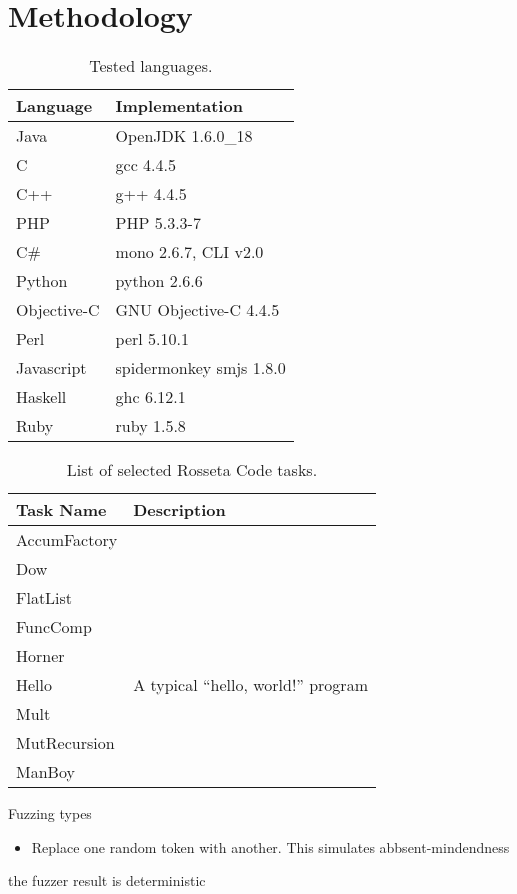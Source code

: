 \documentclass[10pt]{sigplanconf}
\begin{document}
\section{Methodology} %
\begin{table}
\begin{center}
\caption{Tested languages.}
\label{tab:langs}
\begin{tabular}{ l l}
 \hline
Language & Implementation \\
\hline
Java 		& OpenJDK 1.6.0\_18 \\
C 		& gcc 4.4.5 \\
C++ 		& g++ 4.4.5 \\
PHP 		& PHP 5.3.3-7 \\
C\# 		& mono 2.6.7, CLI v2.0 \\
Python 		& python 2.6.6 \\
Objective-C 	& GNU Objective-C 4.4.5 \\
Perl 		& perl 5.10.1 \\
Javascript 	& spidermonkey smjs 1.8.0 \\
Haskell 	& ghc 6.12.1 \\
Ruby 		& ruby 1.5.8 \\
\hline
\end{tabular}
\end{center}
\end{table}

\begin{table}
\begin{center}
\caption{List of selected Rosseta Code tasks.}
\label{tab:Tasks}
\begin{tabular}{ l p{4cm}}
 \hline
Task Name & Description\\
\hline
AccumFactory & \\
Dow & \\
FlatList & \\
FuncComp & \\
Horner & \\
Hello & A typical ``hello, world!'' program\\
Mult & \\
MutRecursion & \\
ManBoy & \\
\hline
\end{tabular}
\end{center}
\end{table}


Fuzzing types
\begin{itemize}
\item Replace one random token with another.
This simulates abbsent-mindendness 
\end{itemize}
the fuzzer result is deterministic
\end{document}
